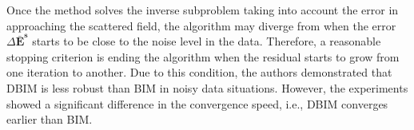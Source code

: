 			Once the method solves the inverse subproblem taking into account the error in approaching the scattered field, the algorithm may diverge from when the error $\Delta\mathbf{\bar{E}^s}$ starts to be close to the noise level in the data. Therefore, a reasonable stopping criterion is ending the algorithm when the residual starts to grow from one iteration to another. Due to this condition, the authors demonstrated that DBIM is less robust than BIM in noisy data situations. However, the experiments showed a significant difference in the convergence speed, i.e., DBIM converges earlier than BIM.
			
